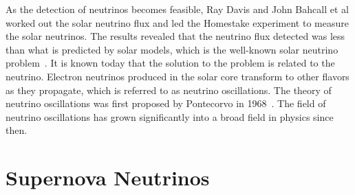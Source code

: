 As the detection of neutrinos becomes feasible, Ray Davis and John Bahcall et al worked out the solar neutrino flux and led the Homestake experiment to measure the solar neutrinos. The results revealed that the neutrino flux detected was less than what is predicted by solar models, which is the well-known solar neutrino problem~\cite{Bahcall1973}. It is known today that the solution to the problem is related to the neutrino. Electron neutrinos produced in the solar core transform to other flavors as they propagate, which is referred to as neutrino oscillations. The theory of neutrino oscillations was first proposed by Pontecorvo in 1968~\cite{Pontecorvo1968}. The field of neutrino oscillations has grown significantly into a broad field in physics since then.



\section{Supernova Neutrinos}



